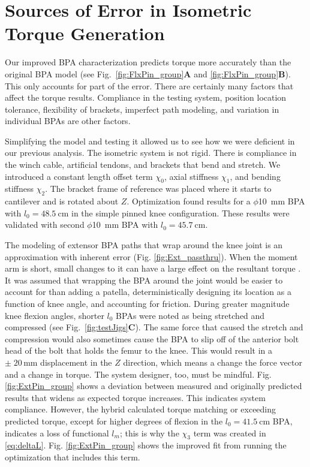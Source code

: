 \section{Sources of Error in Isometric Torque Generation}\label{sec:disc_error}

Our improved BPA characterization predicts torque more accurately than the original BPA model (see Fig.~\ref{fig:FlxPin_group}\textbf{A} and \ref{fig:FlxPin_group}\textbf{B}). This only accounts for part of the error. There are certainly many factors that affect the torque results. Compliance in the testing system, position location tolerance, flexibility of brackets, imperfect path modeling, and variation in individual BPAs are other factors.

Simplifying the model and testing it allowed us to see how we were deficient in our previous analysis. The isometric system is not rigid. There is compliance in the winch cable, artificial tendons, and brackets that bend and stretch. We introduced a constant length offset term $\chi_{0}$, axial stiffness $\chi_{1}$, and bending stiffness $\chi_{2}$. The bracket frame of reference was placed where it starts to cantilever and is rotated about $Z$.  Optimization found results for a $\phi$\qty{10}{\mm} BPA with $l_{0}=\qty{48.5}{\cm}$ in the simple pinned knee configuration. These results were validated with second $\phi$\qty{10}{\mm} BPA with $l_{0}=\qty{45.7}{\cm}$.

The modeling of extensor BPA paths that wrap around the knee joint is an approximation with inherent error (Fig. \ref{fig:Ext_passthru}). When the moment arm is short, small changes to it can have a large effect on the resultant torque \citep{young_analyzing_2019}. It was assumed that wrapping the BPA around the joint would be easier to account for than adding a patella, deterministically designing its location as a function of knee angle, and accounting for friction. During greater magnitude knee flexion angles, shorter $l_{0}$ BPAs were noted as being stretched and compressed (see Fig.~\ref{fig:testJigs}\textbf{C}). The same force that caused the stretch and compression would also sometimes cause the BPA to slip off of the anterior bolt head of the bolt that holds the femur to the knee. This would result in a $\pm \; 20\,\text{mm}$ displacement in the $Z$ direction, which means a change the force vector and a change in torque. The system designer, too, must be mindful. Fig. \ref{fig:ExtPin_group} shows a deviation between measured and originally predicted results that widens as expected torque increases. This indicates system compliance. However, the  hybrid calculated torque matching or exceeding predicted torque, except for higher degrees of flexion in the $l_{0}=\qty{41.5}{\cm}$ BPA, indicates a loss of functional $l_m$; this is why the $\chi_{3}$ term was created in \eqref{eq:deltaL}. Fig. \ref{fig:ExtPin_group} shows the improved fit from running the optimization that includes this term.

